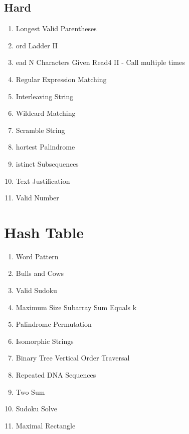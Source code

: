\documentclass[DIV=calc, paper=a4, fontsize=11pt, twocolumn]{scrartcl}	 %
\begin{document}
\subsection*{Hard}
\begin{enumerate}
\item Longest Valid Parentheses \cite{032}
\item ord Ladder II  \cite{126}
\item ead N Characters Given Read4 II - Call multiple times \cite{158}
\item Regular Expression Matching  \cite{010}
\item Interleaving String  \cite{097}
\item Wildcard Matching  \cite{044}
\item Scramble String  \cite{087}
\item hortest Palindrome  \cite{214}
\item istinct Subsequences  \cite{115}
\item Text Justification \cite{068}
\item Valid Number   \cite{065}
\end{enumerate}


\section*{Hash Table}

\begin{enumerate}
\item Word Pattern \cite{290} 
\item Bulls and Cows \cite{299}
\item Valid Sudoku \cite{036}
\item Maximum Size Subarray Sum Equals k \cite{325}
\item Palindrome Permutation \cite{266}
\item Isomorphic Strings \cite{205}
\item Binary Tree Vertical Order Traversal \cite{314} 
\item Repeated DNA Sequences \cite{187}
\item Two Sum \cite{001}
\item Sudoku Solve \cite{037}
\item Maximal Rectangle \cite{085}
\end{enumerate}

{}

\end{document}
